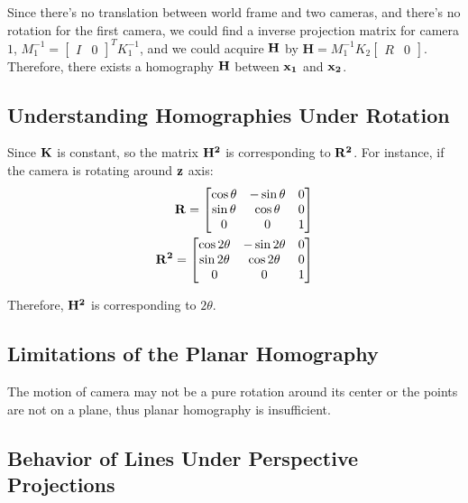 \documentclass[11pt]{article} \usepackage{fullpage} \usepackage{graphicx} \usepackage{epstopdf} \usepackage{color} \usepackage{psfrag} \usepackage{pdfsync}\usepackage{indentfirst}\usepackage{subfigure}\usepackage{float}\usepackage[section]{placeins}
\begin{document}
Since there's no translation between world frame and two cameras, and there's no rotation for the first camera, we could find a inverse projection matrix for camera $1$, $M_1^{-1} = \left[ \begin{smallmatrix} I & 0  \end{smallmatrix} \right]^{T}K_1^{-1}$, and we could acquire $\bold{H}$ by $\boldsymbol{H} = M_1^{-1}K_2\left[ \begin{smallmatrix} R & 0  \end{smallmatrix} \right]$. Therefore, there exists a homography $\bold{H}$ between $\bold{x_1}$ and $\bold{x_2}$.

\subsection{Understanding Homographies Under Rotation}

Since $\bold{K}$ is constant, so the matrix $\bold{H^2}$ is corresponding to $\bold{R^2}$. For instance, if the camera is rotating around $\bold{z}$ axis:
\begin{align}
	\bold{R} = 
	\begin{bmatrix}
		\cos{\theta} & -\sin{\theta} & 0 \\
		\sin{\theta} & \cos{\theta} & 0 \\
		0 & 0 & 1
	\end{bmatrix} \\
	\bold{R^2} = 
	\begin{bmatrix}
		\cos{2\theta} & -\sin{2\theta} & 0 \\
		\sin{2\theta} & \cos{2\theta} & 0 \\
		0 & 0 & 1
	\end{bmatrix}
\end{align}

Therefore, $\bold{H^2}$ is corresponding to $2\theta$.

\subsection{Limitations of the Planar Homography}

The motion of camera may not be a pure rotation around its center or the points are not on a plane, thus planar homography is insufficient.

\subsection{Behavior of Lines Under Perspective Projections}
\end{document}
